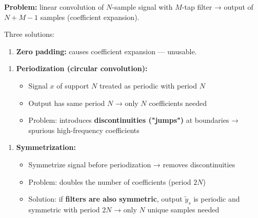 \textbf{Problem:} linear convolution of $N$-sample signal with $M$-tap filter → output of $N+M-1$ samples (coefficient expansion).

Three solutions:

\begin{enumerate}
\item \textbf{Zero padding:} causes coefficient expansion — unusable.
\end{enumerate}

\begin{enumerate}
\item \textbf{Periodization (circular convolution):}
\begin{itemize}
\item Signal $x$ of support $N$ treated as periodic with period $N$
\item Output has same period $N$ → only $N$ coefficients needed
\item Problem: introduces \textbf{discontinuities ("jumps")} at boundaries → spurious high-frequency coefficients
\end{itemize}
\end{enumerate}

\begin{center}\end{center}

\begin{enumerate}
\item \textbf{Symmetrization:}
\begin{itemize}
\item Symmetrize signal before periodization → removes discontinuities
\item Problem: doubles the number of coefficients (period $2N$)
\item Solution: if \textbf{filters are also symmetric}, output $\tilde{y}_s$ is periodic and symmetric with period $2N$ → only $N$ unique samples needed
\end{itemize}
\end{enumerate}

\begin{center}\end{center}


